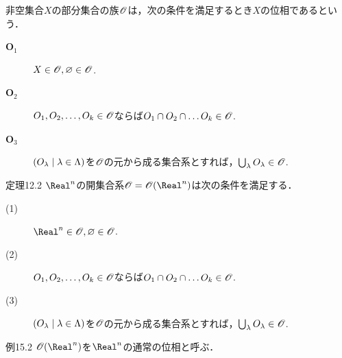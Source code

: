 \documentclass[uplatex,a4paper,dvipdfmx,aspectratio=169,11pt]{beamer}
\begin{document}
\begin{frame}[fragile]{}
    \begin{block}{}
        非空集合$X$の部分集合の族$\mathscr{O}$は，次の条件を満足するとき$X$の\alert{位相}であるという．
       \begin{description}
           \item[$\textbf{O}_1$] $X \in \mathscr{O}, \varnothing \in \mathscr{O}$.
           \item[$\textbf{O}_2$] $O_1, O_2, \ldots, O_k \in \mathscr{O}$ならば$O_1 \cap O_2 \cap \dots O_k \in \mathscr{O}$.
           \item[$\textbf{O}_3$] $\qty(O_\lambda \mid \lambda \in \Lambda)$を$\mathscr{O}$の元から成る集合系とすれば，$\bigcup_\lambda O_\lambda \in \mathscr{O}$.
       \end{description} 
    \end{block}
    \begin{block}{定理12.2}
        $\Real^n$の開集合系$\Opens = \Opens(\Real^n)$は次の条件を満足する．
       \begin{description}
           \item[(1)] $\Real^n \in \Opens, \varnothing \in \Opens$.
           \item[(2)] $O_1, O_2, \ldots, O_k \in \mathscr{O}$ならば$O_1 \cap O_2 \cap \dots O_k \in \mathscr{O}$.
           \item[(3)] $\qty(O_\lambda \mid \lambda \in \Lambda)$を$\mathscr{O}$の元から成る集合系とすれば，$\bigcup_\lambda O_\lambda \in \mathscr{O}$.
       \end{description} 
    \end{block}

    \begin{exampleblock}{例15.2}
        $\Opens(\Real^n)$を$\Real^n$の\alert{通常の位相}と呼ぶ．
    \end{exampleblock} 
\end{frame}
\end{document}

